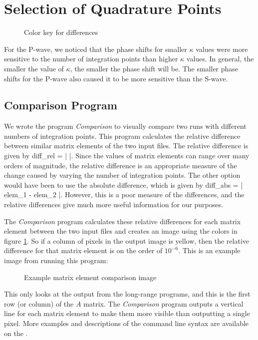 \documentclass[Dissertation.tex]{subfiles}
\begin{document}
\section{Selection of Quadrature Points}
\label{sec:SelQuadPoints2}

\begin{figure}[H]
	\caption{Color key for differences}
	\label{fig:ColorKey}
\end{figure}

For the P-wave, we noticed that the phase shifts for smaller $\kappa$ values were more sensitive to the number of integration points than higher $\kappa$ values. In general, the smaller the value of $\kappa$, the smaller the phase shift will be. The smaller phase shifts for the P-wave also caused it to be more sensitive than the S-wave.

\subsection{Comparison Program}
We wrote the program \emph{Comparison} to visually compare two runs with different numbers of integration points. This program calculates the relative difference between similar matrix elements of the two input files. The relative difference is given by
\beq
diff_{rel} = \left|  \right|.
\eeq
Since the values of matrix elements can range over many orders of magnitude, the relative difference is an appropriate measure of the change caused by varying the number of integration points. The other option would have been to use the absolute difference, which is given by 
\beq
diff_{abs} = \left| elem_1 - elem_2 \right|.
\eeq
However, this is a poor measure of the differences, and the relative differences give much more useful information for our purposes.

The \emph{Comparison} program calculates these relative differences for each matrix element between the two input files and creates an image using the colors in figure \ref{fig:ColorKey}. So if a column of pixels in the output image is yellow, then the relative difference for that matrix element is on the order of $10^{-6}$. This is an example image from running this program:
\begin{figure}[H]
	\centering
	\caption{Example matrix element comparison image}
	\label{fig:QuadExample}
\end{figure}
This only looks at the output from the long-range programs, and this is the first row (or column) of the $A$ matrix. The \emph{Comparison} program outputs a vertical line for each matrix element to make them more visible than outputting a single pixel. More examples and descriptions of the command line syntax are available on the  \cite{Wiki}.
\end{document}
